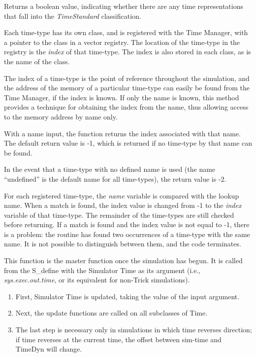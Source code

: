 {\begin{enumerate}
{\begin{enumerate}
Returns a boolean value, indicating whether there are any time
representations that fall into the \textit{TimeStandard} classification.

\label{ref:timetypeslookup}Each time-type has its own class, and is
registered with the Time Manager, with a pointer to the class in a
vector registry.  The location of the time-type in the registry is the
\textit{index} of that time-type.  The index is also stored in each
class, as is the name of the class.

The index of a time-type is the point of reference throughout the
simulation, and the address of the memory of a particular time-type can
easily be found from the Time Manager, if the index is known.  If only the name
is known, this method provides a technique for obtaining the index from the
name, thus allowing access to the memory address by name only.

With a name input, the function returns the index associated with that
name.  The default return value is -1, which is returned if no
time-type by that name can be found.

In the event that a time-type with no defined name is used (the name
{\textquotedblleft}undefined{\textquotedblright} is the default name for all
time-types), the
return value is -2.

For each registered time-type, the \textit{name }variable is compared
with the lookup name.  When a match is found, the index value is
changed from -1 to the \textit{index} variable of that time-type.  The
remainder of the time-types are still checked before returning.  If a
match is found and the index value is not equal to -1, there is a
problem:  the routine has found two occurrences of a time-type with the
same name.  It is not possible to distinguish between them, and the
code terminates.

This function is the master function once the simulation has begun.  It
is called from the S\_define with the Simulator Time as its argument (i.e.,
\textit{sys.exec.out.time}, or its equivalent for non-Trick
simulations).

\begin{enumerate}
\item First, Simulator Time is updated, taking the value of the input argument.
\item Next, the update functions are called on all subclasses of Time.
\item The last step is necessary only in simulations in which time
reverses direction;  if time reverses at the current time, the offset
between sim-time and TimeDyn will change.
\end{enumerate}


\end{enumerate}}
\end{enumerate}}
